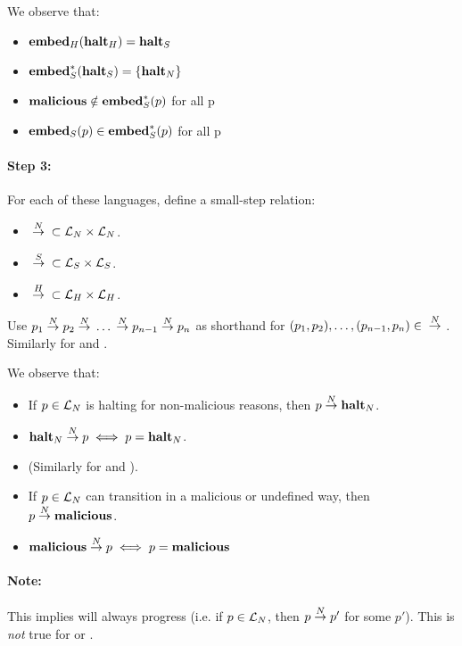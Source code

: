 We observe that:

\begin{itemize}
\item ${{\mathbf{embed}}_H}({\mathbf{halt}_H}) = {\mathbf{halt}_S}$
\item ${\mathbf{embed}^\ast_S}({\mathbf{halt}_S}) = \{{\mathbf{halt}_N}\}$
\item ${\mathbf{malicious}} \notin {\ensuremath{\mathbf{embed}^\ast_S}}(p)$ for all p
\item ${{\mathbf{embed}}_S}(p) \in {\ensuremath{\mathbf{embed}^\ast_S}}(p)$ for all p
\end{itemize}

\paragraph{Step 3:} For each of these languages, define a small-step relation:

\begin{itemize}
\item ${{}\stackrel{N}{->}{}} \subset \mathcal{L}_N \times \mathcal{L}_N$.
\item ${{}\stackrel{S}{->}{}} \subset \mathcal{L}_S \times \mathcal{L}_S$.
\item ${{}\stackrel{H}{->}{}} \subset \mathcal{L}_H \times \mathcal{L}_H$.
\end{itemize}

Use $p_1 {{}\stackrel{N}{->}{}} p_2 {{}\stackrel{N}{->}{}} \dots {{}\ensuremath{\stackrel{N}{->}}{}} p_{n-1} {{}\stackrel{N}{->}{}} p_n$
as shorthand for $(p_1, p_2), \dots, (p_{n-1}, p_n) \in {{}\ensuremath{\stackrel{N}{->}}{}}$. Similarly
for \simpleo{->} and \higho{->}.

We observe that:

\begin{itemize}
\item If $p \in \mathcal{L}_N$ is halting for non-malicious reasons, then
  $p {{}\stackrel{N}{->}{}} {\mathbf{halt}_N}$.
\item ${\mathbf{halt}_N} {{}\stackrel{N}{->}{}} p \iff p = {\mathbf{halt}_N}$.
\item (Similarly for \simplelang and \highlang).
\item If $p \in \mathcal{L}_N$ can transition in a malicious or undefined way,
  then $p {{}\stackrel{N}{->}{}} {\mathbf{malicious}}$.
\item ${\mathbf{malicious}} {{}\stackrel{N}{->}{}} p \iff p = {\mathbf{malicious}}$
\end{itemize}

\paragraph{Note:} This implies \nativelang will always progress (i.e. if
$p \in \mathcal{L}_N$, then $p {{}\stackrel{N}{->}{}} p'$ for some $p'$). This is \emph{not}
true for \simplelang or \highlang.


